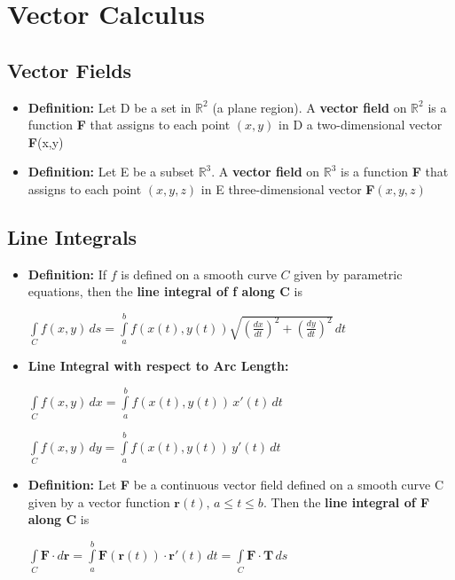 \documentclass{report}
\begin{document}
\chapter{Vector Calculus}
	\section{Vector Fields}
		\begin{itemize}\addtolength{\leftskip}{2em}
			\item \textbf{Definition:} Let D be a set in $\mathbb{R}^2$ (a plane region). A \textbf{vector field} on $\mathbb{R}^2$ is a function \textbf{F} that assigns to each point $(x,y)$ in D a two-dimensional vector \textbf{F}(x,y)
			\item \textbf{Definition:} Let E be a subset $\mathbb{R}^3$. A \textbf{vector field} on $\mathbb{R}^3$ is a function \textbf{F} that assigns to each point $(x,y,z)$ in E three-dimensional vector \textbf{F}$(x,y,z)$
		\end{itemize}
	\section{Line Integrals}
		\begin{itemize}\addtolength{\leftskip}{2em}
			\item \textbf{Definition:} If $f$ is defined on a smooth curve $C$ given by parametric equations, then the \textbf{line integral of f along C} is 
			\begin{center}
				\Large$\int\limits_{C}^{}f(x,y)\, ds=\int\limits_{a}^{b}f(x(t),y(t))\sqrt{(\frac{dx}{dt})^2+(\frac{dy}{dt})^2}\,dt$
			\end{center}
			\item \textbf{Line Integral with respect to Arc Length:}
			\begin{center}
			\Large$\int\limits_{C}^{}f(x,y)\,dx=\int\limits_{a}^{b}f(x(t),y(t))\,x'(t)\,dt$
			\end{center}
			\begin{center}
			\Large$\int\limits_{C}^{}f(x,y)\,dy=\int\limits_{a}^{b}f(x(t),y(t))\,y'(t)\,dt$
			\end{center}
			\item\textbf{Definition:} Let \textbf{F} be a continuous vector field defined on a smooth curve C given by a vector function $\textbf{r}(t),\, a\le t\le b$. Then the \textbf{line integral of F along C} is 
			\begin{center}
			$\int\limits_{C}^{}\textbf{F}\cdot d\textbf{r}=\int\limits_{a}^{b}\textbf{F}(\textbf{r}(t))\cdot \textbf{r}'(t)\,dt=\int\limits_{C}^{}\textbf{F}\cdot \textbf{T}\,ds$
			\end{center}
		\end{itemize}
\end{document}
